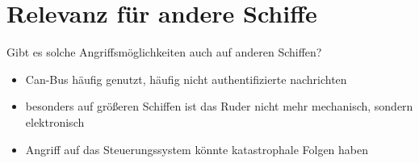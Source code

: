 \section{Relevanz für andere Schiffe}
Gibt es solche Angriffsmöglichkeiten auch auf anderen Schiffen?
\begin{itemize}
    \item Can-Bus häufig genutzt, häufig nicht authentifizierte nachrichten
    \item besonders auf größeren Schiffen ist das Ruder nicht mehr mechanisch, sondern elektronisch
    \item Angriff auf das Steuerungssystem könnte katastrophale Folgen haben
\end{itemize}
